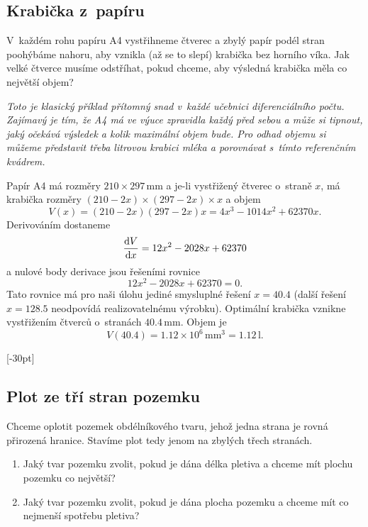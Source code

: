 \subsection{Krabička z papíru}  V každém rohu papíru A4 vystřihneme
čtverec a zbylý papír podél stran poohýbáme nahoru, aby vznikla (až se
to slepí) krabička bez horního víka. Jak velké čtverce musíme
odstříhat, pokud chceme, aby výsledná
krabička měla co největší objem?


\textit{Toto je klasický příklad přítomný snad v každé učebnici diferenciálního počtu. Zajímavý je tím, že A4 má ve výuce zpravidla každý před sebou a může si tipnout, jaký očekává výsledek a kolik maximální objem bude. Pro odhad objemu si můžeme představit třeba litrovou krabici mléka a porovnávat s tímto referenčním kvádrem.}



\reseni Papír A4 má rozměry $210\times 297\,\mathrm{mm}$ a je-li vystřižený čtverec o straně $x$, má krabička rozměry $(210-2x)\times(297-2x)\times x$ a objem
\begin{equation*}
V(x)=(210-2x)(297-2x)x=4 x^3 - 1014 x^2 + 62370 x.
\end{equation*}
Derivováním dostaneme
\begin{equation*}
  \frac{\mathrm{d}V}{\mathrm{d}x} = 12x^2 - 2028x + 62370
\end{equation*}
a nulové body derivace jsou řešeními rovnice 
\begin{equation*}
   12x^2 - 2028x + 62370 = 0.
 \end{equation*}
 Tato rovnice má pro naši úlohu jediné smysluplné řešení $x=40.4$ (další řešení $x=128.5$ neodpovídá realizovatelnému výrobku). Optimální krabička vznikne vystřižením čtverců o stranách $40.4\,\mathrm{mm}$. Objem je
 \begin{equation*}
   V(40.4)=1.12 \times 10^6\,\mathrm {mm}^3=1.12\,\mathrm{l}.
 \end{equation*}
 \konec

 
[-30pt] \subsection{Plot ze tří stran pozemku}  Chceme oplotit
pozemek obdélníkového tvaru, jehož jedna strana je rovná přirozená
hranice. Stavíme plot tedy jenom na zbylých třech stranách.
\begin{enumerate}[(1)] pt
\item Jaký tvar pozemku zvolit, pokud je dána délka pletiva a chceme mít plochu pozemku co největší?
\item Jaký tvar pozemku zvolit, pokud je dána plocha pozemku a chceme mít co nejmenší spotřebu pletiva?
\end{enumerate}



